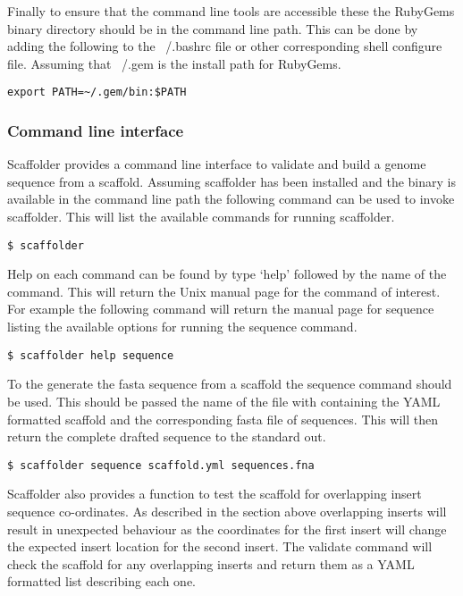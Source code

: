 \documentclass[10pt]{bmc_article}
\newenvironment{bmcformat}{\begin{raggedright}\baselineskip20pt\sloppy\setboolean{publ}{false}}{\end{raggedright}\baselineskip20pt\sloppy}
\begin{document}
\begin{bmcformat}
Finally to ensure that the command line tools are accessible these the
RubyGems binary directory should be in the command line path. This can be done
by adding the following to the ~/.bashrc file or other corresponding shell
configure file. Assuming that ~/.gem is the install path for RubyGems.

\begin{verbatim}
export PATH=~/.gem/bin:$PATH
\end{verbatim}

\subsubsection*{Command line interface} %

Scaffolder provides a command line interface to validate and build a genome
sequence from a scaffold. Assuming scaffolder has been installed and the
binary is available in the command line path the following command can be used
to invoke scaffolder. This will list the available commands for running
scaffolder.

\begin{verbatim}
$ scaffolder
\end{verbatim}

Help on each command can be found by type `help' followed by the name of the
command. This will return the Unix manual page for the command of interest.
For example the following command will return the manual page for sequence
listing the available options for running the sequence command.

\begin{verbatim}
$ scaffolder help sequence
\end{verbatim} 

To the generate the fasta sequence from a scaffold the sequence command should
be used. This should be passed the name of the file with containing the YAML
formatted scaffold and the corresponding fasta file of sequences. This will
then return the complete drafted sequence to the standard out.

\begin{verbatim}
$ scaffolder sequence scaffold.yml sequences.fna
\end{verbatim}

Scaffolder also provides a function to test the scaffold for overlapping
insert sequence co-ordinates. As described in the section above overlapping
inserts will result in unexpected behaviour as the coordinates for the first
insert will change the expected insert location for the second insert. The
validate command will check the scaffold for any overlapping inserts and
return them as a YAML formatted list describing each one.


\end{bmcformat}
\end{document}
